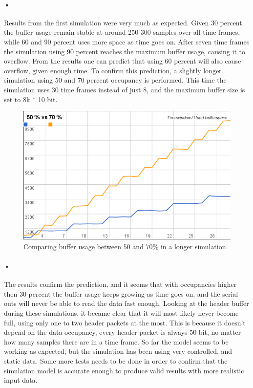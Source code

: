 \documentclass[a4paper, 12pt]{report}\dfrac{\right }{•}
\begin{document}
\paragraph{•} %
Results from the first simulation were very much as expected.
Given 30 percent the buffer usage remain stable at around 250-300 samples over all time frames, while 60 and 90 percent uses more space as time goes on.
After seven time frames the simulation using 90 percent reaches the maximum buffer usage, causing it to overflow.
From the results one can predict that using 60 percent will also cause overflow, given enough time.
To confirm this prediction, a slightly longer simulation using 50 and 70 percent occupancy is performed.
This time the simulation uses 30 time frames instead of just 8, and the maximum buffer size is set to 8k * 10 bit.

\begin{figure}[h!]
	\centering
		\includegraphics[width=1.0\textwidth]{images/50v70.png}
		\caption{Comparing buffer usage between 50 and 70\% in a longer simulation.}
		\label{fig:results-50-70}
\end{figure}

\paragraph{•} %
The results confirm the prediction, and it seems that with occupancies higher then 30 percent the buffer usage keeps growing as time goes on, and the serial outs will never be able to read the data fast enough.
Looking at the header buffer during these simulations, it became clear that it will most likely never become full, using only one to two header packets at the most.
This is because it doesn't depend on the data occupancy, every header packet is always 50 bit, no matter how many samples there are in a time frame.
So far the model seems to be working as expected, but the simulation has been using very controlled, and static data.
Some more tests needs to be done in order to confirm that the simulation model is accurate enough to produce valid results with more realistic input data.
\end{document}
